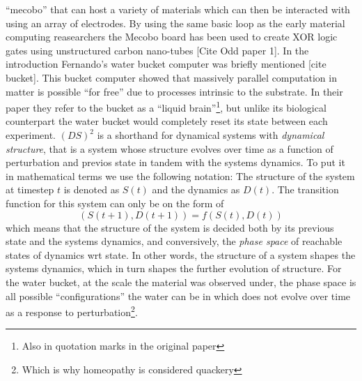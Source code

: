 ``mecobo'' that can host a variety of materials which can then be interacted
with using an array of electrodes.
By using the same basic loop as the early material computing reasearchers the
Mecobo board has been used to create XOR logic gates using unstructured carbon
nano-tubes [Cite Odd paper 1].
In the introduction Fernando's water bucket computer was briefly mentioned [cite
bucket].
This bucket computer showed that massively parallel computation in matter is
possible ``for free'' due to processes intrinsic to the substrate.
In their paper they refer to the bucket as a ``liquid brain''\footnote{Also in
  quotation marks in the original paper}, but unlike its biological counterpart
the water bucket would completely reset its state between each experiment.
%
$(DS)^2$ is a shorthand for dynamical systems with \emph{dynamical structure},
that is a system whose structure evolves over time as a function of perturbation
and previos state in tandem with the systems dynamics.
%
To put it in mathematical terms we use the following notation: The structure of
the system at timestep $t$ is denoted as $S(t)$ and the dynamics as $D(t)$.
The transition function for this system can only be on the form of $$(S(t+1),
D(t+1)) = f(S(t),D(t))$$
which means that the structure of the system is decided both by its previous
state and the systems dynamics, and conversively, the \emph{phase space} of
reachable states of dynamics wrt state.
%
In other words, the structure of a system shapes the systems dynamics, which in
turn shapes the further evolution of structure. 
For the water bucket, at the scale the material was observed under, the phase
space is all possible ``configurations'' the water can be in which does not
evolve over time as a response to perturbation\footnote{Which is why homeopathy
  is considered quackery}. 

